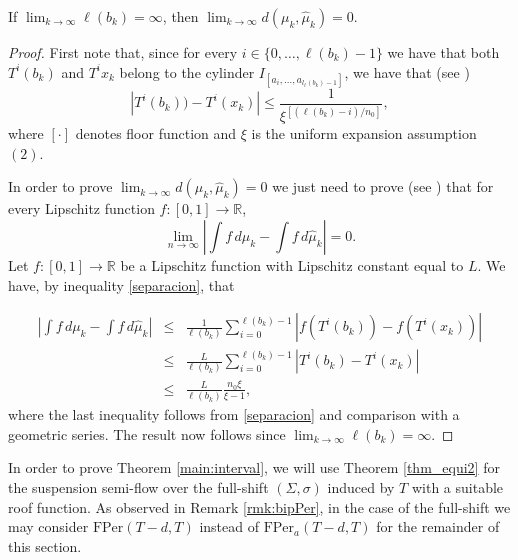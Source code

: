 \documentclass[letterpaper,11pt]{amsart}
\numberwithin{equation}{section}     %
\newcommand{\R}{\mathbb{R}}
\def\R{{\mathbb R}}
\begin{document}
\begin{proposition}\label{prop:per_and_div} If $\lim_{k\to\infty} \ell(b_k) =\infty$, then $\lim_{k\to\infty} d(\mu_k,\hat{\mu}_k)=0$.
\end{proposition}
\begin{proof}
First note that, since for every $i \in \{0, \dots, \ell(b_k)-1\}$ we have that both $T^i(b_k)$ and $T^i x_k$ belong to the cylinder
$I_{[a_i, \dots , a_{l_\ell(b_k)-1}]}$, we have that (see \cite[Page 172]{cfs})
\begin{equation} \label{separacion}
|T^{i}(b_k)) - T^i(x_k) | \leq \frac{1}{\xi^{[(\ell(b_k)-i)/n_0]}},
\end{equation}
where $[\cdot]$ denotes floor function and $\xi$ is the uniform expansion assumption $(2)$. 

In order to prove $\lim_{k \to \infty} d(\mu_k, \hat{\mu}_k)=0$ we just need to prove (see \cite[Theorem 13.16 (ii)]{kl}) that for every Lipschitz function $f:[0,1] \to \R$,
\begin{equation*}
\lim_{n \to \infty} \left| \int f \, d \mu_k - \int f \, d \hat{\mu}_k \right| =0.
\end{equation*} 
Let $f:[0,1] \to \R$ be a Lipschitz function with Lipschitz constant equal to $L$. We have, by inequality \eqref{separacion}, that

\begin{eqnarray*}
\left| \int f \, d \mu_k - \int f \, d \hat{\mu}_k \right| &\leq& \frac{1}{\ell(b_k)} \sum_{i=0}^{\ell(b_k)-1} |	f(	T^{i}(	b_k)) -	f(	  T^i (x_k))|\\ 
&\leq& \frac{L}{\ell(b_k)} \sum_{i=0}^{\ell(b_k)-1}|T^{i}(	b_k) -	  T^i (x_k)| \\ 
&\leq & \frac{L}{\ell(b_k)} \frac{n_0\xi}{\xi-1}, 
\end{eqnarray*}
where the last inequality follows from \eqref{separacion} and comparison with a geometric series. The result now follows since $\lim_{k \to \infty} \ell(b_k)= \infty$.
\end{proof}

In order to prove Theorem \ref{main:interval}, we will use Theorem \ref{thm_equi2} for the suspension semi-flow over the full-shift $(\Sigma,\sigma)$ induced by $T$ with a suitable roof function. As observed in Remark \ref{rmk:bipPer}, in the case of the full-shift we may consider $\textrm{FPer}(T-d,T)$ instead of $\textrm{FPer}_a(T-d,T)$ for the remainder of this section. 
\end{document}
